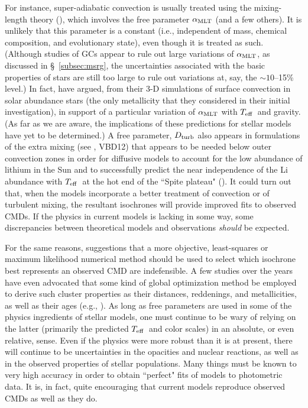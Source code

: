 \documentclass[12pt,preprint]{aastex}
\newcommand\teff{{T_{\rm eff}}}
\newcommand\amlt{{\alpha_{\rm MLT}}}
\begin{document}
For instance, super-adiabatic convection is usually treated using the
mixing-length theory (\citealt{bo58}), which involves the free parameter $\amlt$
(and a few others).  It is unlikely that this parameter is a constant (i.e.,
independent of mass, chemical composition, and evolutionary state), even though
it is treated as such.  (Although studies of GCs appear to rule out large
variations of $\amlt$, as discussed in \S~\ref{subsec:msrg}, the uncertainties
associated with the basic properties of stars are still too large to rule out
variations at, say, the $\sim 10$--15\% level.)  In fact, \citet{ts11} have
argued, from their 3-D simulations of surface convection in solar abundance
stars (the only metallicity that they considered in their initial
investigation), in support of a particular variation of $\alpha_{\rm MLT}$ with
$\teff$\ and gravity.  (As far as we are aware, the implications of these
predictions for stellar models have yet to be determined.)  A free parameter,
$D_{\rm turb}$ also appears in formulations of the extra mixing (see
\citealt{rmr02}, VBD12) that appears to be needed below outer convection zones
in order for diffusive models to account for the low abundance of lithium in
the Sun and to successfully predict the near independence of the Li abundance
with $\teff$\ at the hot end of the ``Spite plateau" (\citealt{ss82}).  It could
turn out that, when the models incorporate a better treatment of convection or
of turbulent mixing, the resultant isochrones will provide improved fits to
observed CMDs.  If the physics in current models is lacking in some way,
some discrepancies between theoretical models and observations {\it should} be
expected.

For the same reasons, suggestions that a more objective, least-squares or 
maximum likelihood numerical method should be used to select which isochrone
best represents an observed CMD are indefensible.  A few studies over the years
have even advocated that some kind of global optimization method be employed
to derive such cluster properties as their distances, reddenings, and
metallicities, as well as their ages (e.g., \citealt{md11}).  As long as free
parameters are used in some of the physics ingredients of stellar models, one
must continue to be wary of relying on the latter (primarily the predicted 
$\teff$\ and color scales) in an absolute, or even relative, sense.  Even if
the physics were more robust than it is at present, there will continue to be
uncertainties in the opacities and nuclear reactions, as well as in the observed
properties of stellar populations.  Many things must be known to very high
accuracy in order to obtain ``perfect" fits of models to photometric data.  It
is, in fact, quite encouraging that current models reproduce observed CMDs as
well as they do.
\end{document}
